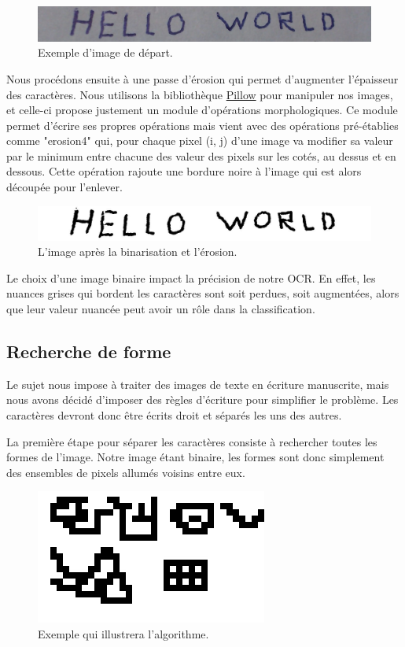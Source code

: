 \documentclass[a4paper, 12pt]{article}
\begin{document}
\begin{figure}[!ht]
\centering
\includegraphics[scale=0.3]{img/text2.jpg}
\caption{Exemple d'image de départ.}
\end{figure}

Nous procédons ensuite à une passe d'érosion qui permet d'augmenter l'épaisseur des caractères. Nous utilisons la bibliothèque \href{https://pypi.python.org/pypi/Pillow}{Pillow} pour manipuler nos images, et celle-ci propose justement un module d'opérations morphologiques. Ce module permet d'écrire ses propres opérations mais vient avec des opérations pré-établies comme "erosion4" qui, pour chaque pixel (i, j) d'une image va modifier sa valeur par le minimum entre chacune des valeur des pixels sur les cotés, au dessus et en dessous. Cette opération rajoute une bordure noire à l'image qui est alors découpée pour l'enlever.

\begin{figure}[!ht]
\centering
\includegraphics[scale=0.3]{img/text2_bin.jpg}
\caption{L'image après la binarisation et l'érosion.}
\end{figure}

Le choix d'une image binaire impact la précision de notre OCR. En effet, les nuances grises qui bordent les caractères sont soit perdues, soit augmentées, alors que leur valeur nuancée peut avoir un rôle dans la classification.

\subsection{Recherche de forme}
Le sujet nous impose à traiter des images de texte en écriture manuscrite, mais nous avons décidé d'imposer des règles d'écriture pour simplifier le problème. Les caractères devront donc être écrits droit et séparés les uns des autres.

La première étape pour séparer les caractères consiste à rechercher toutes les formes de l'image. Notre image étant binaire, les formes sont donc simplement des ensembles de pixels allumés voisins entre eux.

\begin{figure}[!ht]
\centering
\includegraphics[scale=1]{img/shape.jpg}
\caption{Exemple qui illustrera l'algorithme.}
\end{figure}
\end{document}
